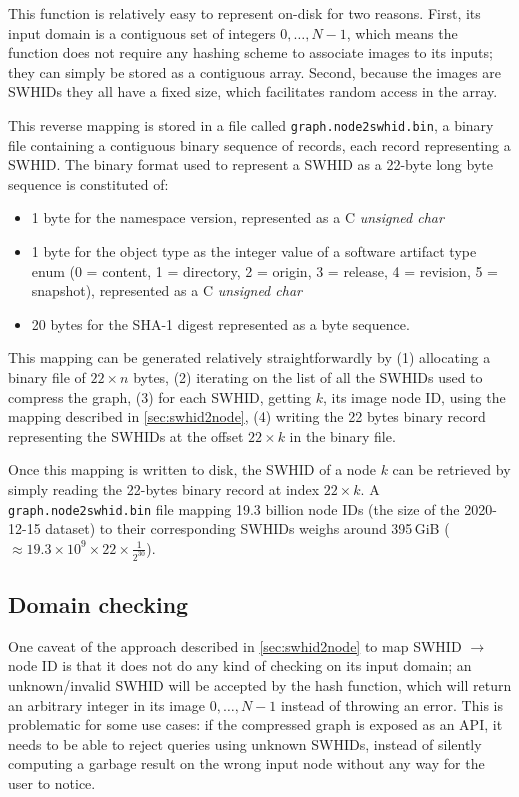 This function is relatively easy to represent on-disk for two reasons. First,
its input domain is a contiguous set of integers ${0,\ldots,N-1}$, which means
the function does not require any hashing scheme to associate images to its
inputs; they can simply be stored as a contiguous array. Second, because the
images are \glspl{SWHID} they all have a fixed size, which facilitates random
access in the array.

This reverse mapping is stored in a file called \texttt{graph.node2swhid.bin},
a binary file containing a contiguous binary sequence of records, each record
representing a \gls{SWHID}. The binary format used to represent a \gls{SWHID}
as a 22-byte long byte sequence is constituted of:

\begin{itemize}
    \item 1 byte for the namespace version, represented as a C \emph{unsigned
        char}
    \item 1 byte for the object type as the integer value of a software
        artifact type enum (0 = content, 1 = directory, 2 = origin, 3 =
        release, 4 = revision, 5 = snapshot), represented as a C \emph{unsigned
        char}
    \item 20 bytes for the SHA-1 digest represented as a byte sequence.
\end{itemize}

This mapping can be generated relatively straightforwardly by (1) allocating a
binary file of $22 \times n$ bytes, (2) iterating on the list of all the
\glspl{SWHID} used to compress the graph, (3) for each \gls{SWHID}, getting
$k$, its image node ID, using the mapping described in \cref{sec:swhid2node},
(4) writing the 22 bytes binary record representing the \glspl{SWHID} at the
offset $22 \times k$ in the binary file.

Once this mapping is written to disk, the \gls{SWHID} of a node $k$ can be
retrieved by simply reading the 22-bytes binary record at index $22 \times k$.
A \texttt{graph.node2swhid.bin} file mapping 19.3 billion node IDs (the size of
the 2020-12-15 dataset) to their corresponding \glspl{SWHID} weighs
around 395\,GiB ($\approx 19.3 \times 10^9 \times 22 \times \frac{1}{2^{30}}$).

\subsection{Domain checking}

One caveat of the approach described in \cref{sec:swhid2node} to map
\gls{SWHID} $\to$ node ID is that it does not do any kind of checking on its
input domain; an unknown/invalid \gls{SWHID} will be accepted by the hash
function, which will return an arbitrary integer in its image ${0,\ldots,N-1}$
instead of throwing an error. This is problematic for some use cases: if the
compressed graph is exposed as an API, it needs to be able to reject queries
using unknown \glspl{SWHID}, instead of silently computing a garbage result on
the wrong input node without any way for the user to notice.

